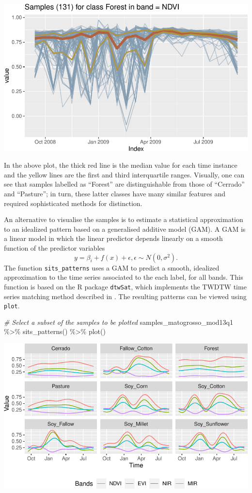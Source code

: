\documentclass[a4paper,]{tufte-book}
\newenvironment{Shaded}{}{}
\newcommand{\CommentTok}[1]{\textcolor[rgb]{0.38,0.63,0.69}{\textit{#1}}}
\newcommand{\FunctionTok}[1]{\textcolor[rgb]{0.02,0.16,0.49}{#1}}
\newcommand{\NormalTok}[1]{#1}
\newcommand{\SpecialCharTok}[1]{\textcolor[rgb]{0.25,0.44,0.63}{#1}}
\begin{document}
\begin{center}\includegraphics[width=0.7\linewidth]{sitsbook_files/figure-latex/unnamed-chunk-45-1} \end{center}

In the above plot, the thick red line is the median value for each time instance and the yellow lines are the first and third interquartile ranges. Visually, one can see that samples labelled as ``Forest'' are distinguishable from those of ``Cerrado'' and ``Pasture''; in turn, these latter classes have many similar features and required sophisticated methods for distinction.

An alternative to visualise the samples is to estimate a statistical approximation to an idealized pattern based on a generalised additive model (GAM). A GAM is a linear model in which the linear predictor depends linearly on a smooth function of the predictor variables
\[
y = \beta_{i} + f(x) + \epsilon, \epsilon \sim N(0, \sigma^2).
\]
The function \texttt{sits\_patterns} uses a GAM to predict a smooth, idealized approximation to the time series associated to the each label, for all bands. This function is based on the R package \texttt{dtwSat}\citep{Maus2019}, which implements the TWDTW time series matching method described in \citet{Maus2016}. The resulting patterns can be viewed using \texttt{plot}.

\begin{Shaded}
\begin{Highlighting}[]
\CommentTok{\# Select a subset of the samples to be plotted}
\NormalTok{samples\_matogrosso\_mod13q1 }\SpecialCharTok{\%\textgreater{}\%} 
    \FunctionTok{sits\_patterns}\NormalTok{() }\SpecialCharTok{\%\textgreater{}\%} 
    \FunctionTok{plot}\NormalTok{()}
\end{Highlighting}
\end{Shaded}

\begin{center}\includegraphics[width=0.7\linewidth]{sitsbook_files/figure-latex/unnamed-chunk-46-1} \end{center}
\end{document}

